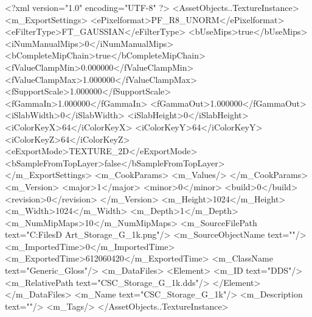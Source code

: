 <?xml version="1.0" encoding="UTF-8" ?>
<AssetObjects..TextureInstance>
	<m_ExportSettings>
		<ePixelformat>PF_R8_UNORM</ePixelformat>
		<eFilterType>FT_GAUSSIAN</eFilterType>
		<bUseMips>true</bUseMips>
		<iNumManualMips>0</iNumManualMips>
		<bCompleteMipChain>true</bCompleteMipChain>
		<fValueClampMin>0.000000</fValueClampMin>
		<fValueClampMax>1.000000</fValueClampMax>
		<fSupportScale>1.000000</fSupportScale>
		<fGammaIn>1.000000</fGammaIn>
		<fGammaOut>1.000000</fGammaOut>
		<iSlabWidth>0</iSlabWidth>
		<iSlabHeight>0</iSlabHeight>
		<iColorKeyX>64</iColorKeyX>
		<iColorKeyY>64</iColorKeyY>
		<iColorKeyZ>64</iColorKeyZ>
		<eExportMode>TEXTURE_2D</eExportMode>
		<bSampleFromTopLayer>false</bSampleFromTopLayer>
	</m_ExportSettings>
	<m_CookParams>
		<m_Values/>
	</m_CookParams>
	<m_Version>
		<major>1</major>
		<minor>0</minor>
		<build>0</build>
		<revision>0</revision>
	</m_Version>
	<m_Height>1024</m_Height>
	<m_Width>1024</m_Width>
	<m_Depth>1</m_Depth>
	<m_NumMipMaps>10</m_NumMipMaps>
	<m_SourceFilePath text="C:\Users\Shadow\Desktop\Working Files\3D Art\Textures\CSC_Storage_G_1k.png"/>
	<m_SourceObjectName text=""/>
	<m_ImportedTime>0</m_ImportedTime>
	<m_ExportedTime>612060420</m_ExportedTime>
	<m_ClassName text="Generic_Gloss"/>
	<m_DataFiles>
		<Element>
			<m_ID text="DDS"/>
			<m_RelativePath text="CSC_Storage_G_1k.dds"/>
		</Element>
	</m_DataFiles>
	<m_Name text="CSC_Storage_G_1k"/>
	<m_Description text=""/>
	<m_Tags/>
</AssetObjects..TextureInstance>

